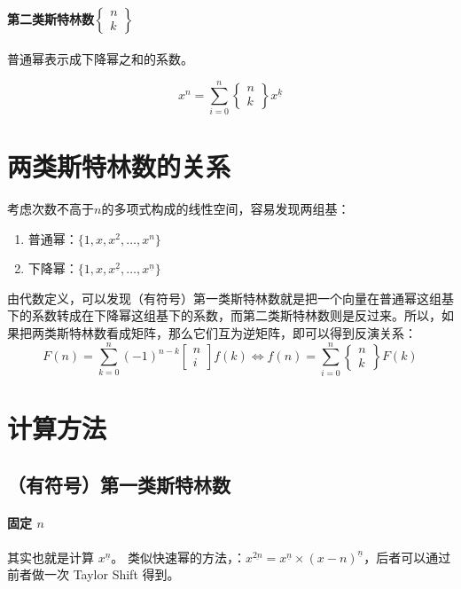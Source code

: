 \documentclass{article}
\begin{document}
\paragraph{第二类斯特林数$\begin{Bmatrix}n\\k\end{Bmatrix}$}
普通幂表示成下降幂之和的系数。

$$
x^n = \sum_{i=0}^n \begin{Bmatrix}n\\k\end{Bmatrix} x^{\underline{k}}
$$

\section{两类斯特林数的关系}

考虑次数不高于$n$的多项式构成的线性空间，容易发现两组基：
\begin{enumerate}
    \item 普通幂：$\{1,x,x^2,\ldots, x^n\}$
    \item 下降幂：$\{1,x,x^{\underline{2}},\ldots, x^{\underline{n}}\}$
\end{enumerate}

由代数定义，可以发现（有符号）第一类斯特林数就是把一个向量在普通幂这组基下的系数转成在下降幂这组基下的系数，而第二类斯特林数则是反过来。所以，如果把两类斯特林数看成矩阵，那么它们互为逆矩阵，即可以得到反演关系：
$$
F(n) =   \sum_{k = 0}^n (-1)^{n-k}\begin{bmatrix}n\\i\end{bmatrix} f(k)      \iff f(n) = \sum_{i=0}^n \begin{Bmatrix}n\\k\end{Bmatrix} F(k)
$$

\section{计算方法}

\subsection{（有符号）第一类斯特林数}

\paragraph{固定 $n$}
其实也就是计算 $x^{\underline{n}}$。
类似快速幂的方法，：$x^{\underline{2n}} = x^{\underline{n}}\times (x-n)^{\underline{n}}$，后者可以通过前者做一次 Taylor Shift 得到。
\end{document}
